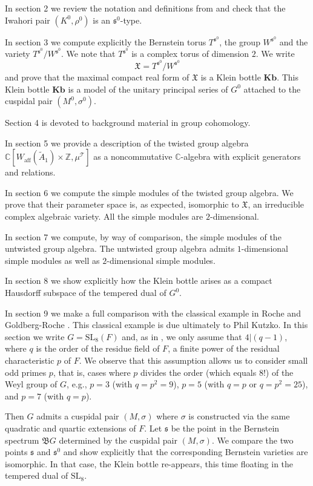 \documentclass[11pt]{amsart}
\theoremstyle{remark}
\theoremstyle{definition}
\def\fB{\mathfrak{B}}
\def\fX{\mathfrak{X}}
\newcommand{\Z}{\mathbb{Z}}
\newcommand{\C}{\mathbb{C}}
\newcommand{\SL}{\mathrm{SL}}
\newcommand{\fs}{\mathfrak{s}}
\def\fB{\mathfrak{B}}
\begin{document}
In section 2 we review the notation and definitions from \cite{AFO} and check that the Iwahori pair $(K^0, \rho^0)$ is an $\fs^0$-type.   

In section 3 we compute explicitly the Bernstein torus $T^{\fs^0}$, the  group $W^{\fs^0}$ and the variety $T^{\fs^0} / W^{\fs^0}$.   We note  that $T^{\fs^0}$  is  a complex torus of dimension $2$.
 We write 
\[
\mathfrak{X} = T^{\fs^0} / W^{\fs^0}
\]
and prove that the maximal compact real form of $\fX$ is  a Klein bottle $\mathbf{Kb}$.   This Klein bottle $\mathbf{Kb}$ is a model of the unitary principal series of $G^0$ attached  to the cuspidal pair $(M^0, \sigma^0)$.   

Section 4 is devoted to background material in group cohomology.   

In section 5 we provide a  description of the twisted group algebra $\C[W_{\mathrm{aff}}(\widetilde{A}_1) \times \Z, \mu^\mathcal{T}]$ as a 
noncommutative $\C$-algebra with explicit generators and relations.  

In section 6 we compute the simple modules of the twisted group algebra.   We prove that their parameter space is, as expected, isomorphic to $\mathfrak{X}$, an irreducible complex algebraic variety.      All the simple modules are $2$-dimensional.   

In section 7 we compute, by way of comparison, the simple modules of the untwisted group algebra.   The untwisted group algebra admits $1$-dimensional simple modules as well as $2$-dimensional simple modules.   

In section 8 we show explicitly how the Klein bottle arises as a compact Hausdorff subspace of the tempered dual of $G^0$.   

In section 9 we make a full comparison with the classical example in Roche \cite{R} and Goldberg-Roche \cite{GR2}.   This classical example is due ultimately to Phil Kutzko.   
In this section we write $G = \SL_8(F)$ and, as in \cite{R}, we only assume that $4|(q-1)$, where $q$ is the order of the residue field of $F$, a finite power of the residual characteristic $p$ of $F$.
We observe that this assumption allows us to consider small odd primes $p$, that is, cases where $p$ divides the order (which equals $8!$) of the Weyl group of $G$, e.g., $p=3$ (with $q=p^2=9$),  $p=5$ (with $q=p$ or $q=p^2=25$), and  $p=7$ (with $q=p$).

Then $G$ admits a cuspidal pair $(M,\sigma)$ where $\sigma$ is constructed via the same quadratic and quartic extensions of $F$.  
 Let $\fs$ be the point in the Bernstein spectrum $\fB G$ determined by the cuspidal pair $(M, \sigma)$.   We compare the two points $\fs$ and $\fs^0$ and show explicitly that the corresponding Bernstein varieties 
  are isomorphic.   In that case, the Klein bottle re-appears, this time floating in the tempered dual of $\SL_8$.   
\end{document}
